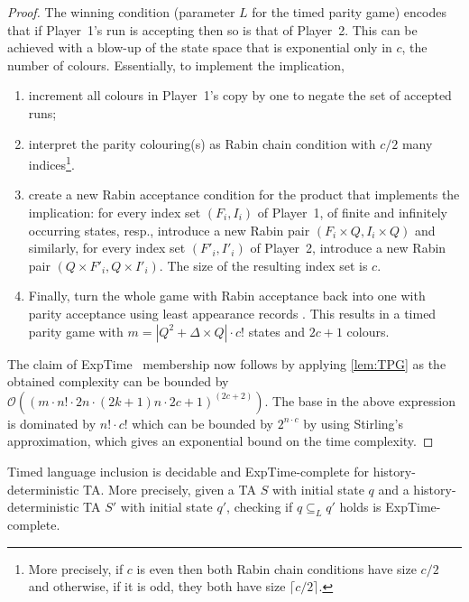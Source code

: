 \documentclass[10pt,a4paper]{amsart}
\theoremstyle{definition}
\numberwithin{equation}{section}
\newcommand{\x}{\times}
\newcommand{\card}[1]{|#1|}
\newcommand{\exptime}{\EXPTIME}
\newcommand{\states}{Q}
\newcommand{\transitions}{\Delta}
\newcommand{\langincl}[1][L]{\subseteq_{L}}
\newcommand{\lts}{S}
\newcommand{\EXPTIME}{{\sc ExpTime}}
\begin{document}
\begin{proof}
The winning condition (parameter $L$ for the timed parity game) encodes
that if Player~1's run is accepting then so is that of Player~2.
This can be achieved with a blow-up of the state space that is exponential only in $c$, the number of colours.
Essentially, to implement the implication, 
\begin{enumerate}
    \item increment all colours in Player~1's copy by one to negate the set of accepted runs;
    \item interpret the parity colouring(s) as Rabin chain condition with $c/2$ many indices\footnote{More precisely, if $c$ is even then both Rabin chain conditions have size $c/2$ and otherwise, if it is odd, they both have size $\lceil c/2\rceil$.}.
    \item create a new Rabin acceptance condition for the product that implements the implication:
        for every index set $(F_i,I_i)$ of Player~1, of finite and infinitely occurring states, resp.,
        introduce a new Rabin pair $(F_i\x\states, I_i\x\states)$ and similarly,
        for every index set $(F'_i,I'_i)$ of Player~2, introduce a new Rabin pair $(\states\x F'_i, \states\x I'_i)$. The size of the resulting index set is $c$. 
    \item Finally, turn the whole game with Rabin acceptance back into one with parity acceptance
        using least appearance records \cite{Gurevi82,Dziemb97}.
        This results in a timed parity game with $m=\card{\states^2+\transitions\x\states} \cdot c!$
        states and $2c+1$ colours.
\end{enumerate}
The claim of \exptime~ membership now follows by applying \cref{lem:TPG} as the obtained complexity can be bounded by $\mathcal{O}((m\cdot n!\cdot 2n \cdot (2k+1)n \cdot 2c+1)^{(2c+2)})$. The base in the above expression is dominated by $n!\cdot c!$ which can be bounded by $2^{n\cdot c}$ by using Stirling's approximation, which gives an exponential bound on the time complexity. 
\end{proof}

\begin{corollary}\label{cor:inclusion}
    Timed language inclusion is decidable and \EXPTIME-complete
    for history-deterministic TA.
    More precisely, given 
    a TA $\lts$ with initial state $q$
    and a history-deterministic TA $\lts'$ with initial state $q'$,
    checking if $q\langincl q'$ holds is \EXPTIME-complete.
\end{corollary}
\end{document}
